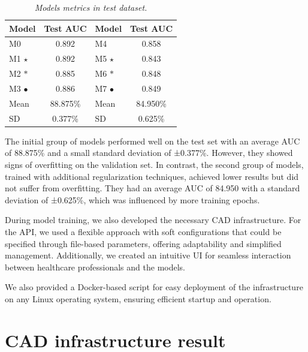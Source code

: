 \begin{table}[H]
\centering
\begin{tabular}{lc|lc}
    \toprule
  \textbf{Model} & \textbf{Test AUC} & \cellcolor{gray!50}\textbf{Model} & \cellcolor{gray!50}\textbf{Test AUC}  \\
\midrule
 M0 & 0.892 & \cellcolor{gray!50}M4 & \cellcolor{gray!50}0.858 \\
 M1 $\star$ & 0.892 & \cellcolor{gray!50}M5 $\star$ & \cellcolor{gray!50}0.843 \\
 M2 $\ast$ &  0.885 &  \cellcolor{gray!50}M6 $\ast$ & \cellcolor{gray!50}0.848 \\
 M3 $\bullet$ & 0.886 & \cellcolor{gray!50}M7 $\bullet$ & \cellcolor{gray!50}0.849 \\
 \midrule
Mean &  88.875\% & \cellcolor{gray!50}Mean & \cellcolor{gray!50}84.950\%  \\
SD &  0.377\%  &   \cellcolor{gray!50}SD &  \cellcolor{gray!50}0.625\%  \\

\bottomrule
\end{tabular}
\caption[Models metrics in test dataset]
  {\textit{Models metrics in test dataset.}}
{\label{table:test-set-resume-metrics}}
\end{table}

The initial group of models performed well on the test set with an average AUC
of 88.875\% and a small standard deviation of ±0.377\%. However, they showed
signs of overfitting on the validation set. In contrast, the second group of
models, trained with additional regularization techniques, achieved lower
results but did not suffer from overfitting. They had an average AUC of 84.950%
with a standard deviation of ±0.625\%, which was influenced by more training
epochs.

During model training, we also developed the necessary CAD infrastructure. For
the API, we used a flexible approach with soft configurations that could be
specified through file-based parameters, offering adaptability and simplified
management. Additionally, we created an intuitive UI for seamless interaction
between healthcare professionals and the models.

We also provided a Docker-based script for easy deployment of the
infrastructure on any Linux operating system, ensuring efficient startup and
operation.

\section{CAD infrastructure result}
